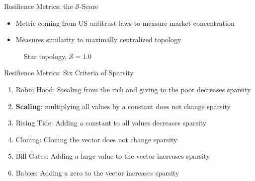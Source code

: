 \begin{frame}{Resilience Metrics: the $\mathscr{S}$-Score}
    \begin{itemize}
        \item Metric coming from US antitrust laws to measure market concentration
        \item Measures similarity to maximally centralized topology
    \end{itemize}
    \begin{figure}[H]
        \centering
        \caption{Star topology, $\mathscr{S}=1.0$}
    \end{figure}
\end{frame}
\begin{frame}{Resilience Metrics: Six Criteria of Sparsity~\cite{sparsity}}
    \begin{enumerate}
        \item Robin Hood: Stealing from the rich and giving to the poor decreases sparsity
        \item \textbf{Scaling}: multiplying all values by a constant does not change sparsity
        \item Rising Tide: Adding a constant to all values decreases sparsity
        \item Cloning: Cloning the vector does not change sparsity
        \item Bill Gates: Adding a large value to the vector increases sparsity
        \item Babies: Adding a zero to the vector increases sparsity
    \end{enumerate}
\end{frame}

